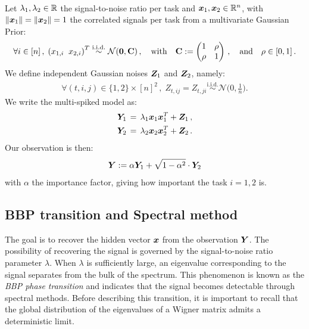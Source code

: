 \documentclass[11pt]{article}
\begin{document}
\begin{defn}\leavevmode\\
    Let $\lambda_1, \lambda_2 \in {\mathbb R}$ the signal-to-noise ratio per task and $\bm{x}_1, \bm{x}_2 \in {\mathbb R}^n$, with $ \|\bm{x}_1 \| =  \|\bm{x}_2 \| = 1$ the correlated signals per task from a multivariate Gaussian Prior:
    \begin{align}
        \forall i \in[n]\,,\; \left( {x_{1,i}\;\; x_{2,i}} \right)^T \overset{\mathrm{i.i.d.}}{\sim} \mathcal{N}(\bm{0}, \boldsymbol{\mathbf{C}})\, ,\quad\mathrm{with}\quad \boldsymbol{\mathbf{C}} := \begin{pmatrix}
            1 & \rho \\
            \rho & 1 
        \end{pmatrix}\,,\quad \mathrm{and}\quad \rho \in [0,1]\,.
    \end{align} 
    We define independent  Gaussian noises $\bm{Z}_1$ and $\bm{Z}_2$, namely:
    \begin{align}
        \forall (t,i,j) \in\{1,2\}\times[n]^2 \,, \; Z_{t,ij} = Z_{t,ji} \overset{\mathrm{i.i.d.}}{\sim} \mathcal{N}\bigg(0,\frac{1}{n}\bigg) .
    \end{align}
    We write the multi-spiked model as:
    \begin{align}
        \bm{Y}_1 \, = \, \lambda_1 \bm{x}_1 \bm{x}_1^T + \bm{Z}_1 \, , \\
        \bm{Y}_2 \, = \, \lambda_2 \bm{x}_2 \bm{x}_2^T + \bm{Z}_2 \, .
    \end{align}
    \noindent
    Our observation is then:
    \begin{equation}
    \bm{Y} := \alpha \bm{Y}_1 + \sqrt{1-\alpha^2} \cdot \bm{Y}_2
    \label{eq:2spikes}
    \end{equation}
    \noindent
    with $ \alpha$ the importance factor, giving how important the task $i = 1,2$ is.
\end{defn}

\subsection{ BBP transition and Spectral method} 

The goal is to recover the hidden vector $\bm{x}$ from the observation $\bm{Y}$. The possibility of recovering the signal is governed by the signal-to-noise ratio parameter $\lambda$. When $\lambda$ is sufficiently large, an eigenvalue corresponding to the signal separates from the bulk of the spectrum. This phenomenon is known as the \emph{BBP phase transition} and indicates that the signal becomes detectable through spectral methods.
\noindent
Before describing this transition, it is important to recall that the global distribution of the eigenvalues of a Wigner matrix admits a deterministic limit.
\end{document}
